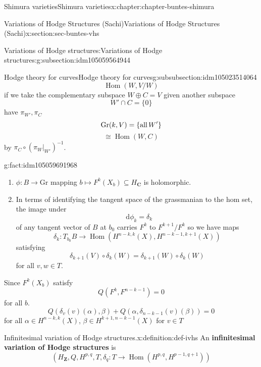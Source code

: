 \documentclass[oneside,10pt,]{book}
\newcommand{\terminology}[1]{\textbf{#1}}
\numberwithin{equation}{section}
\newcommand{\diff}{\mathop{}\!\mathrm{d}}
\newcommand{\inv}{^{-1}}
\newcommand{\ZZ}{\mathbf{Z}}
\newcommand{\CC}{\mathbf{C}}
\DeclareMathOperator{\Hom}{Hom}
\begin{document}
\begin{chapterptx}{Shimura varieties}{}{Shimura varieties}{}{}{x:chapter:chapter-buntes-shimura}
\begin{sectionptx}{Variations of Hodge Structures (Sachi)}{}{Variations of Hodge Structures (Sachi)}{}{}{x:section:sec-buntes-vhs}
\begin{subsectionptx}{Variations of Hodge structures:}{}{Variations of Hodge structures:}{}{}{g:subsection:idm105059564944}
\begin{subsubsectionptx}{Hodge theory for curves}{}{Hodge theory for curves}{}{}{g:subsubsection:idm105023514064}
\begin{equation*}
\Hom(W, V/W)
\end{equation*}
if we take the complementary subspace \(W  \oplus C = V\) given another subspace%
\begin{equation*}
W' \cap C =  \{ 0 \}
\end{equation*}
have \(\pi_{W'}, \pi_C\)%
\begin{equation*}
{\mathrm{Gr}}(k,V) = \{\text{all\,}W'\}
\end{equation*}
%
\begin{equation*}
\cong \Hom(W,C)
\end{equation*}
by \(\pi_C \circ (\pi_W|_{W'})\inv\).%
\begin{fact}{}{}{g:fact:idm105059691968}%
%
\begin{enumerate}
\item{}\(\phi\colon B\to {\mathrm{Gr}}\) mapping \(b \mapsto F^k(X_b) \subseteq H_\CC\) is holomorphic.%
\item{}In terms of identifying the tangent space of the grassmanian to the hom set, the image under%
\begin{equation*}
\diff \phi_k = \delta_k
\end{equation*}
of any tangent vector of \(B\) at \(b_0\) carries \(F^{k} \) to \(F^{k+1}/F^k\) so we have maps%
\begin{equation*}
\delta_k \colon T_{b_0} B \to \Hom(H^{n-k,k} (X), H^{n-k-1, k+1}(X))
\end{equation*}
satisfying%
\begin{equation*}
\delta_{k+1} (V) \circ \delta_k(W) =  \delta_{k+1}(W) \circ \delta_k(W)
\end{equation*}
for all \(v,w\in T\).%
\end{enumerate}
%
\end{fact}
Since \(F^k(X_b)\) satisfy%
\begin{equation*}
Q(F^k, F^{n- k - 1} ) = 0
\end{equation*}
for all \(b\).%
\begin{equation*}
Q(\delta_v(v)(\alpha), \beta) + Q(\alpha, \delta_{n-k-1}(v)(\beta)) = 0
\end{equation*}
for all \(\alpha\in H^{n-k, k}(X)\), \(\beta \in H^{k+1, n-k - 1}(X)\) for \(v \in T\)%
\begin{definition}{Infinitesimal variation of Hodge structures.}{x:definition:def-ivhs}%
An \terminology{infinitesimal variation of Hodge structures} is%
\begin{equation*}
(H_\ZZ, Q, H^{p,q}, T, \delta_q\colon T \to \Hom(H^{p,q}, H^{p-1, q+1}))

\end{equation*}
\end{definition}
\end{subsubsectionptx}
\end{subsectionptx}
\end{sectionptx}
\end{chapterptx}
\end{document}
